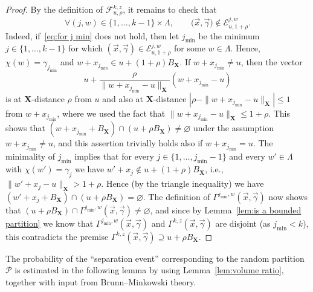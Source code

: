 \documentclass[11pt,reqno]{amsart}
\renewcommand{\le}{\leqslant}
\newcommand{\X}{\mathbf X}
\theoremstyle{remark}
\renewcommand{\supset}{\supseteq}
\renewcommand{\emptyset}{\varnothing}
\renewcommand{\1}{\mathbf 1}
\newcommand{\Part}{\mathscr{P}}
\begin{document}
\begin{proof}
By the definition of $\mathscr{F}_{u,\rho}^{k,z}$, it remains to check that
\begin{equation}\label{eq:for j min}
\forall (j,w)\in \{1,\ldots,k-1\}\times \Lambda,\qquad \big(\vec{x},\vec{\gamma}\big)\notin \mathscr{E}_{u,1+\rho}^{j,w}.
\end{equation}
Indeed, if~\eqref{eq:for j min} does not hold, then let $j_{\min}$ be the minimum $j\in \{1,\ldots,k-1\}$ for which $(\vec{x},\vec{\gamma})\in\mathscr{E}_{u,1+\rho}^{j,w}$ for some $w\in \Lambda$. Hence, $\chi(w)=\gamma_{j_{\min}}$ and $w+x_{j_{\min}}\in u+(1+\rho)B_{\X}$.  If $w+x_{j_{\min}}\neq u$, then the vector $$u+\frac{\rho}{\|w+x_{j_{\min}}-u\|_{\X}}(w+x_{j_{\min}}-u)$$ is at $\X$-distance $\rho$ from $u$ and also at $\X$-distance $|\rho-\|w+x_{j_{\min}}-u\|_{\X}|\le 1$ from $w+x_{j_{\min}}$, where we used the fact that $\|w+x_{j_{\min}}-u\|_{\X}\le 1+\rho$. This shows that $(w+x_{j_{\min}}+B_{\X})\cap (u+\rho B_{\X})\neq \emptyset$ under the assumption $w+x_{j_{\min}}\neq u$, and this assertion trivially holds also if $w+x_{j_{\min}}= u$. The minimality of $j_{\min}$ implies that for every $j\in \{1,\ldots,j_{\min}-1\}$ and every $w'\in \Lambda$ with $\chi(w')=\gamma_j$ we have $w'+x_j\notin u +(1+\rho)B_{\X}$, i.e., $\|w'+x_j-u\|_{\X}>1+\rho$. Hence (by the triangle inequality) we have $(w'+ x_j+B_{\X})\cap (u+\rho B_{\X})=\emptyset$. The definition of $\Gamma^{j_{\min},w}(\vec{x},\vec{\gamma})$ now shows that $ (u+\rho B_\X)\cap \Gamma^{j_{\min},w}(\vec{x},\vec{\gamma})\neq \emptyset$, and since by Lemma~\ref{lem:is a bounded partition} we know that  $\Gamma^{j_{\min},w}(\vec{x},\vec{\gamma})$ and $\Gamma^{k,z}(\vec{x},\vec{\gamma})$ are disjoint (as $j_{\min}<k$), this contradicts the premise  $\Gamma^{k,z}(\vec{x},\vec{\gamma})\supset u+\rho B_{\X}$.
\end{proof}

The probability of the ``separation event'' corresponding to the random partition $\Part$ is estimated in the following lemma by using Lemma~\ref{lem:volume ratio}, together with input from Brunn--Minkowski theory.
\end{document}
